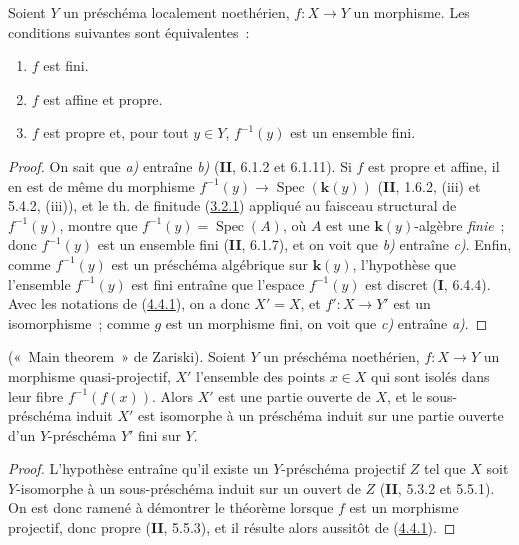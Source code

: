 \begin{proposition}[4.4.2]
\label{III.4.4.2-fr}
Soient $Y$ un préschéma localement noethérien, $f:X\to Y$ un morphisme. Les
conditions suivantes sont équivalentes~:
\begin{enumerate}
\item[\textup{a)}] $f$ est fini.
\item[\textup{b)}] $f$ est affine et propre.
\item[\textup{c)}] $f$ est propre et, pour tout $y\in Y$, $f^{-1}(y)$ est un ensemble
fini.
\end{enumerate}
\end{proposition}

\begin{proof}
On sait que \emph{a)} entraîne \emph{b)} (\textbf{II}, 6.1.2 et 6.1.11). Si $f$ est propre et affine,
il en est de même du morphisme
$f^{-1}(y)\to\operatorname{Spec}(\boldsymbol{k}(y))$ (\textbf{II}, 1.6.2, (iii) et 5.4.2, (iii)),
et le th. de finitude (\hyperref[III.3.2.1-fr]{3.2.1}) appliqué au faisceau
structural de $f^{-1}(y)$, montre que $f^{-1}(y)=\operatorname{Spec}(A)$, où
$A$ est une $\boldsymbol{k}(y)$-algèbre \emph{finie}~; donc $f^{-1}(y)$ est un ensemble fini
(\textbf{II}, 6.1.7), et on voit que \emph{b)} entraîne \emph{c)}. Enfin, comme $f^{-1}(y)$ est un
préschéma algébrique sur $\boldsymbol{k}(y)$, l'hypothèse que l'ensemble $f^{-1}(y)$ est
fini entraîne que l'espace $f^{-1}(y)$ est discret (\textbf{I}, 6.4.4). Avec les
notations de (\hyperref[III.4.4.1-fr]{4.4.1}), on a donc $X'=X$, et
$f':X\to Y'$ est un isomorphisme~; comme $g$ est un morphisme fini, on voit
que \emph{c)} entraîne \emph{a)}.
\end{proof}

\begin{theorem}[4.4.3]
\label{III.4.4.3-fr}
\textnormal{(«~Main theorem~» de Zariski).}
Soient $Y$ un préschéma noethérien, $f:X\to Y$ un morphisme quasi-projectif,
$X'$ l'ensemble des points $x\in X$ qui sont isolés dans leur fibre
$f^{-1}(f(x))$. Alors $X'$ est une partie ouverte de $X$, et le
sous-préschéma induit $X'$ est isomorphe à un préschéma induit sur une partie
ouverte d'un $Y$-préschéma $Y'$ fini sur $Y$.
\end{theorem}

\begin{proof}
L'hypothèse entraîne qu'il existe un $Y$-préschéma projectif $Z$ tel que $X$
soit $Y$-isomorphe à un sous-préschéma induit sur un ouvert de $Z$
(\textbf{II}, 5.3.2 et 5.5.1). On est donc ramené à démontrer le théorème lorsque $f$
est un morphisme projectif, donc propre (\textbf{II}, 5.5.3), et il résulte alors
aussitôt de (\hyperref[III.4.4.1-fr]{4.4.1}).
\end{proof}


